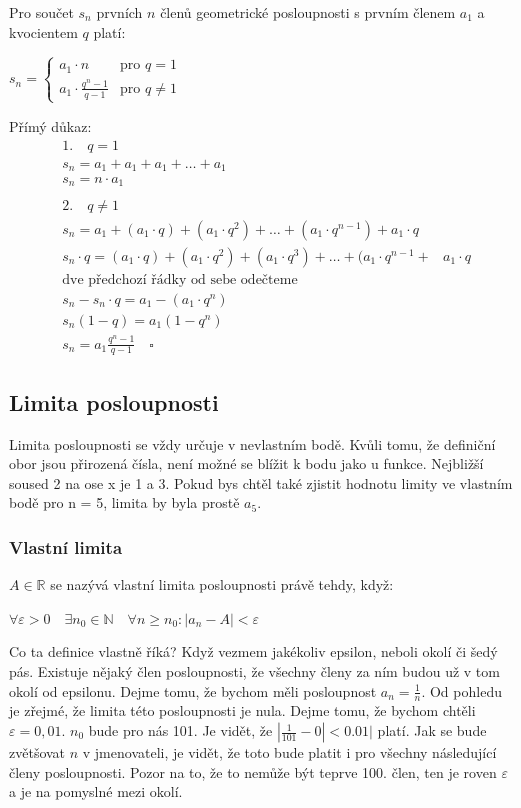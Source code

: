 \documentclass[12pt]{article}
\begin{document}
Pro součet $s_n$ prvních $n$ členů geometrické posloupnosti s prvním členem $a_1$ a kvocientem $q$
platí:

$s_n = \begin{cases} 
    a_1 \cdot n & \text{pro } q = 1 \\
    a_1 \cdot \frac{q^n - 1}{q - 1} & \text{pro } q \neq 1 
\end{cases}$

Přímý důkaz:
\[
\begin{align*}
    &1. \quad q = 1 \\
    &s_n = a_1 + a_1 + a_1 + \dots + a_1 \\
    &s_n = n \cdot a_1 \\\\
    &2. \quad q \neq 1 \\
    &s_n = a_1 + (a_1 \cdot q) + (a_1 \cdot q^2) + \dots + (a_1 \cdot q^{n-1}) + a_1 \cdot q \\
    &s_n \cdot q = (a_1 \cdot q) + (a_1 \cdot q^2) + (a_1 \cdot q^3) + \dots + (a_1 \cdot q^{n-1} +
    &a_1 \cdot q \\
    &\text{dve předchozí řádky od sebe odečteme} \\
    &s_n - s_n \cdot q = a_1 - (a_1 \cdot q^n) \\
    &s_n(1 - q) = a_1(1 - q^n) \\
    &s_n = a_1 \frac{q^n - 1}{q - 1} \quad \square
\end{align*}
\]
\subsection*{Limita posloupnosti}
Limita posloupnosti se vždy určuje v nevlastním bodě. Kvůli tomu, že definiční obor jsou přirozená
čísla, není možné se blížit k bodu jako u funkce. Nejbližší soused 2 na ose x je 1 a 3. Pokud bys
chtěl také zjistit hodnotu limity ve vlastním bodě pro n = 5, limita by byla prostě $a_5$.
\subsubsection*{Vlastní limita}
$A \in \mathbb{R}$ se nazývá vlastní limita posloupnosti právě tehdy, když:

$\forall \varepsilon > 0 \quad \exists n_0 \in \mathbb{N} \quad \forall n \ge n_0 : |a_n - A| <
\varepsilon$

Co ta definice vlastně říká? Když vezmem jakékoliv epsilon, neboli okolí či šedý pás. Existuje nějaký
člen posloupnosti, že všechny členy za ním budou už v tom okolí od epsilonu. Dejme tomu, že bychom
měli posloupnost $a_n = \frac{1}{n}$. Od pohledu je zřejmé, že limita této posloupnosti je nula.
Dejme tomu, že bychom chtěli $\varepsilon = 0,01$. $n_0$ bude pro nás 101. Je vidět, že
$|\frac{1}{101} - 0| < 0.01|$ platí. Jak se bude zvětšovat $n$ v jmenovateli, je vidět, že toto bude
platit i pro všechny následující členy posloupnosti. Pozor na to, že to nemůže být teprve 100. člen,
ten je roven $\varepsilon$ a je na pomyslné mezi okolí.
\end{document}
